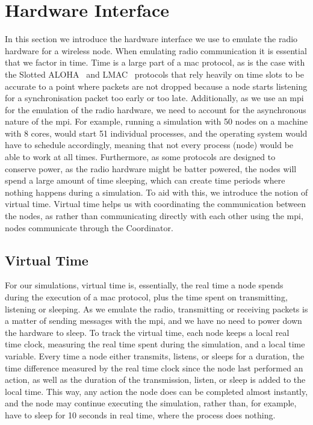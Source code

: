 \section{Hardware Interface}\label{sec:interface}
In this section we introduce the hardware interface we use to emulate the radio hardware for a wireless node.
When emulating radio communication it is essential that we factor in time. 
Time is a large part of a \gls{mac} protocol, as is the case with the Slotted
ALOHA~\cite{Roberts:1975:APS:1024916.1024920} and LMAC~\cite{paper:lmac_protocol} protocols that rely heavily
on time slots to be accurate to a point where packets are not dropped because a node starts listening for a
synchronisation packet too early or too late. Additionally, as we use an \acrshort{mpi} for the emulation of
the radio hardware, we need to account for the asynchronous nature of the \acrshort{mpi}. For example, running
a simulation with 50 nodes on a machine with 8 cores, would start 51 individual processes, and the operating
system would have to schedule accordingly, meaning that not every process (node) would be able to work at all
times. Furthermore, as some protocols are designed to conserve power, as the radio hardware might be batter
powered, the nodes will spend a large amount of time sleeping, which can create time periods where nothing
happens during a simulation. To aid with this, we introduce the notion of virtual time. Virtual time helps us
with coordinating the communication between the nodes, as rather than communicating directly with each other
using the \gls{mpi}, nodes communicate through the Coordinator.

\subsection{Virtual Time}\label{sec:virtual-time}
For our simulations, virtual time is, essentially, the real time a node spends during the execution of a
\gls{mac} protocol, plus the time spent on transmitting, listening or sleeping. As we emulate the radio,
transmitting or receiving packets is a matter of sending messages with the \gls{mpi}, and we have no need to
power down the hardware to sleep. To track the virtual time, each node keeps a local real time clock,
measuring the real time spent during the simulation, and a local time variable. Every time a node either
transmits, listens, or sleeps for a duration, the time difference measured by the real time clock since the
node last performed an action, as well as the duration of the transmission, listen, or sleep is added to the
local time. This way, any action the node does can be completed almost instantly, and the node may continue
executing the simulation, rather than, for example, have to sleep for 10 seconds in real time, where the
process does nothing.

